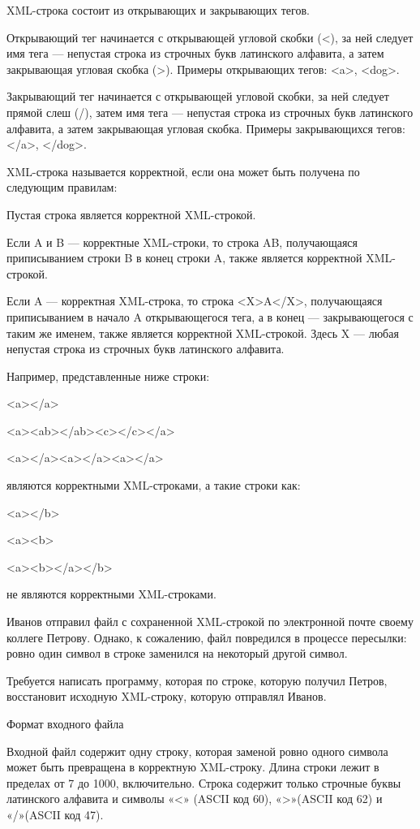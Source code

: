 \documentclass[]{article}
\begin{document}
XML-строка состоит из открывающих и закрывающих тегов.

Открывающий тег начинается с открывающей угловой скобки (<), за ней следует имя тега — непустая строка из строчных букв латинского алфавита, а затем закрывающая угловая скобка (>). Примеры открывающих тегов: <a>, <dog>.

Закрывающий тег начинается с открывающей угловой скобки, за ней следует прямой слеш (/), затем имя тега — непустая строка из строчных букв латинского алфавита, а затем закрывающая угловая скобка. Примеры закрывающихся тегов: </a>, </dog>.

XML-строка называется корректной, если она может быть получена по следующим правилам:

    Пустая строка является корректной XML-строкой.

    Если A и B — корректные XML-строки, то строка AB, получающаяся приписыванием строки B в конец строки A, также является корректной XML-строкой.

    Если A — корректная XML-строка, то строка <X>A</X>, получающаяся приписыванием в начало A открывающегося тега, а в конец — закрывающегося с таким же именем, также является корректной XML-строкой. Здесь X — любая непустая строка из строчных букв латинского алфавита.

Например, представленные ниже строки:

<a></a>

<a><ab></ab><c></c></a>

<a></a><a></a><a></a>

являются корректными XML-строками, а такие строки как:

<a></b>

<a><b>

<a><b></a></b>

не являются корректными XML-строками.

Иванов отправил файл с сохраненной XML-строкой по электронной почте своему коллеге Петрову. Однако, к сожалению, файл повредился в процессе пересылки: ровно один символ в строке заменился на некоторый другой символ.

Требуется написать программу, которая по строке, которую получил Петров, восстановит исходную XML-строку, которую отправлял Иванов.

Формат входного файла

Входной файл содержит одну строку, которая заменой ровно одного символа может быть превращена в корректную XML-строку. Длина строки лежит в пределах от 7 до 1000, включительно. Строка содержит только строчные буквы латинского алфавита и символы «<» (ASCII код 60), «>»(ASCII код 62) и «/»(ASCII код 47).
\end{document}
